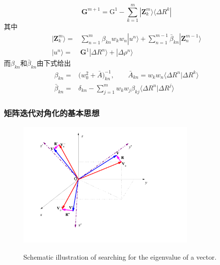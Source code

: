 {\begin{itemize}
\begin{displaymath}
		\mathbf{G}^{m+1}=\mathrm{G}^1-\sum_{k=1}^m|\mathbf{Z}_k^m\rangle\langle\Delta R^k|
	\end{displaymath}
	其中
	\begin{displaymath}
		\begin{aligned}
			|\mathbf{Z}_k^m\rangle=&\sum_{n=1}^m\beta_{kn}w_kw_n|u^n\rangle+\sum_{n=1}^{m-1}\bar{\beta}_{kn}|\mathbf{Z}_n^{m-1}\rangle\\
			|u^n\rangle=&\mathbf{G}^1|\Delta R^n\rangle+|\Delta \rho^n\rangle
		\end{aligned}
	\end{displaymath}
	而$\beta_{kn}$和$\bar\beta_{kn}$由下式给出
	\begin{displaymath}
		\begin{aligned}
			\beta_{kn}=&\big(w_0^2+\bar A\big)_{kn}^{-1},\qquad \bar A_{kn}=w_kw_n\langle\Delta R^n|\Delta R^k\rangle\\
			\bar\beta_{kn}=&\delta_{kn}-\sum_{j=1}^mw_kw_j\beta_{kj}\langle\Delta R^n|\Delta R^j\rangle
		\end{aligned}
	\end{displaymath}
		{\fontsize{7.2pt}{4.2pt}}
	\end{itemize}
}

\frame
{
	\frametitle{矩阵迭代对角化的基本思想}
\begin{figure}[h!]
\centering
\includegraphics[height=2.5in,width=3.5in,viewport=0 0 850 590,clip]{Figures/Coordinate_transformation.png}
\label{decent_CG}
\caption{\tiny \textrm{Schematic illustration of searching for the eigenvalue of a vector.}}%
\end{figure}
}

